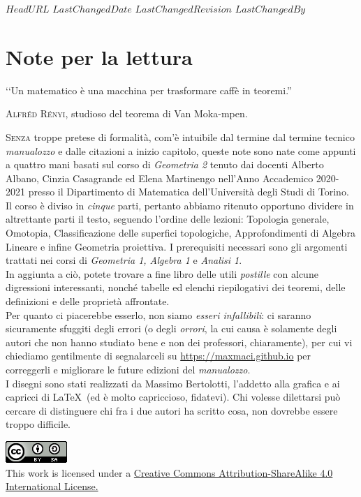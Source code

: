 \svnidlong
{$HeadURL$}
{$LastChangedDate$}
{$LastChangedRevision$}
{$LastChangedBy$}

\chapter*{Note per la lettura}

\begin{introduction}
‘‘Un matematico è una macchina per trasformare caffè in teoremi.''
\begin{flushright}
	\textsc{Alfréd Rényi,} studioso del teorema di Van Moka-mpen.
\end{flushright}
\end{introduction}

\lettrine[findent=1pt, nindent=0pt]{S}{enza} troppe pretese di formalità, com'è intuibile dal termine dal termine tecnico \textit{manualozzo} e dalle citazioni a inizio capitolo, queste note sono nate come appunti a quattro mani basati sul corso di \textit{Geometria 2} tenuto dai docenti Alberto Albano, Cinzia Casagrande ed Elena Martinengo nell'Anno Accademico 2020-2021 presso il Dipartimento di Matematica dell'Università degli Studi di Torino.\\
Il corso è diviso in \textit{cinque} parti, pertanto abbiamo ritenuto opportuno dividere in altrettante parti il testo, seguendo l'ordine delle lezioni: Topologia generale, Omotopia, Classificazione delle superfici topologiche, Approfondimenti di Algebra Lineare e infine Geometria proiettiva. I prerequisiti necessari sono gli argomenti trattati nei corsi di \textit{Geometria 1, Algebra 1} e \textit{Analisi 1}.\\
In aggiunta a ciò, potete trovare a fine libro delle utili \textit{postille} con alcune digressioni interessanti, nonché tabelle ed elenchi riepilogativi dei teoremi, delle definizioni e delle proprietà affrontate.\\
Per quanto ci piacerebbe esserlo, non siamo \textit{esseri infallibili}: ci saranno sicuramente sfuggiti degli errori (o degli \textit{orrori}, la cui causa è solamente degli autori che non hanno studiato bene e non dei professori, chiaramente), per cui vi chiediamo gentilmente di segnalarceli su \textcolor{redill}{\url{https://maxmaci.github.io}} per correggerli e migliorare le future edizioni del \textit{manualozzo}.\\
I disegni sono stati realizzati da Massimo Bertolotti, l'addetto alla grafica e ai capricci di \LaTeX\ (ed è molto capriccioso, fidatevi). Chi volesse dilettarsi può cercare di distinguere chi fra i due autori ha scritto cosa, non dovrebbe essere troppo difficile.
\vfill
\begin{center}
			\includegraphics[trim=0cm 0cm 0cm 0cm,clip,scale=0.5]{images/88x31.png}\\
	{\footnotesize This work is licensed under a \href{https://creativecommons.org/licenses/by-sa/4.0/}{Creative Commons Attribution-ShareAlike 4.0 International License.}}
\end{center}